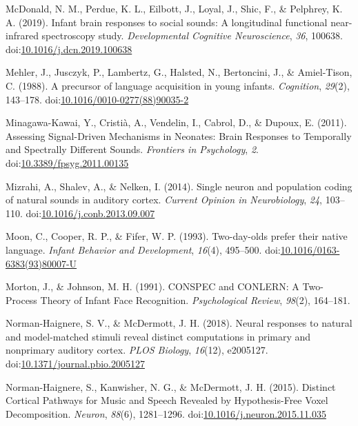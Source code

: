 \documentclass[man]{apa6}
\begin{document}
\hypertarget{ref-mcdonald_infant_2019}{}
McDonald, N. M., Perdue, K. L., Eilbott, J., Loyal, J., Shic, F., \&
Pelphrey, K. A. (2019). Infant brain responses to social sounds: A
longitudinal functional near-infrared spectroscopy study.
\emph{Developmental Cognitive Neuroscience}, \emph{36}, 100638.
doi:\href{https://doi.org/10.1016/j.dcn.2019.100638}{10.1016/j.dcn.2019.100638}

\hypertarget{ref-mehler_precursor_1988}{}
Mehler, J., Jusczyk, P., Lambertz, G., Halsted, N., Bertoncini, J., \&
Amiel-Tison, C. (1988). A precursor of language acquisition in young
infants. \emph{Cognition}, \emph{29}(2), 143--178.
doi:\href{https://doi.org/10.1016/0010-0277(88)90035-2}{10.1016/0010-0277(88)90035-2}

\hypertarget{ref-minagawa-kawai_assessing_2011}{}
Minagawa-Kawai, Y., Cristià, A., Vendelin, I., Cabrol, D., \& Dupoux, E.
(2011). Assessing Signal-Driven Mechanisms in Neonates: Brain Responses
to Temporally and Spectrally Different Sounds. \emph{Frontiers in
Psychology}, \emph{2}.
doi:\href{https://doi.org/10.3389/fpsyg.2011.00135}{10.3389/fpsyg.2011.00135}

\hypertarget{ref-mizrahi_single_2014}{}
Mizrahi, A., Shalev, A., \& Nelken, I. (2014). Single neuron and
population coding of natural sounds in auditory cortex. \emph{Current
Opinion in Neurobiology}, \emph{24}, 103--110.
doi:\href{https://doi.org/10.1016/j.conb.2013.09.007}{10.1016/j.conb.2013.09.007}

\hypertarget{ref-moon_two-day-olds_1993}{}
Moon, C., Cooper, R. P., \& Fifer, W. P. (1993). Two-day-olds prefer
their native language. \emph{Infant Behavior and Development},
\emph{16}(4), 495--500.
doi:\href{https://doi.org/10.1016/0163-6383(93)80007-U}{10.1016/0163-6383(93)80007-U}

\hypertarget{ref-morton_conspec_1991}{}
Morton, J., \& Johnson, M. H. (1991). CONSPEC and CONLERN: A Two-Process
Theory of Infant Face Recognition. \emph{Psychological Review},
\emph{98}(2), 164--181.

\hypertarget{ref-norman-haignere_neural_2018}{}
Norman-Haignere, S. V., \& McDermott, J. H. (2018). Neural responses to
natural and model-matched stimuli reveal distinct computations in
primary and nonprimary auditory cortex. \emph{PLOS Biology},
\emph{16}(12), e2005127.
doi:\href{https://doi.org/10.1371/journal.pbio.2005127}{10.1371/journal.pbio.2005127}

\hypertarget{ref-norman-haignere_distinct_2015}{}
Norman-Haignere, S., Kanwisher, N. G., \& McDermott, J. H. (2015).
Distinct Cortical Pathways for Music and Speech Revealed by
Hypothesis-Free Voxel Decomposition. \emph{Neuron}, \emph{88}(6),
1281--1296.
doi:\href{https://doi.org/10.1016/j.neuron.2015.11.035}{10.1016/j.neuron.2015.11.035}
\end{document}

